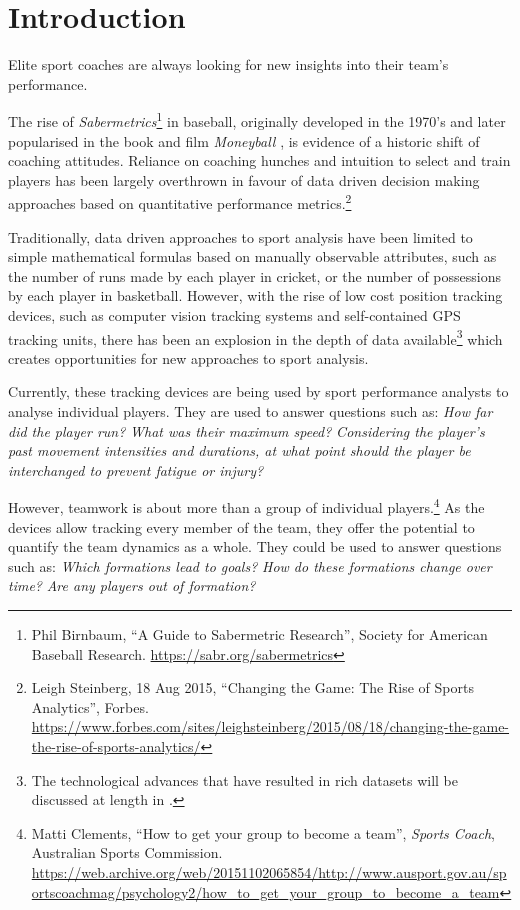 \chapter{Introduction}
\label{ch:intro}
\startchapter


Elite sport coaches are always looking for new insights into their team's performance.

The rise of \textit{Sabermetrics}\footnote{Phil Birnbaum, ``A Guide to Sabermetric Research'', Society for American Baseball Research. \url{https://sabr.org/sabermetrics}} in baseball, originally developed in the 1970's and later popularised in the book and film \textit{Moneyball} \cite{Lewis2004}, is evidence of a historic shift of coaching attitudes. Reliance on coaching hunches and intuition to select and train players has been largely overthrown in favour of data driven decision making approaches based on quantitative performance metrics.\footnote{Leigh Steinberg, 18 Aug 2015, ``Changing the Game: The Rise of Sports Analytics'', Forbes. \url{https://www.forbes.com/sites/leighsteinberg/2015/08/18/changing-the-game-the-rise-of-sports-analytics/}}

Traditionally, data driven approaches to sport analysis have been limited to simple mathematical formulas based on manually observable attributes, such as the number of runs made by each player in cricket, or the number of possessions by each player in basketball. However, with the rise of low cost position tracking devices, such as computer vision tracking systems and self-contained GPS tracking units, there has been an explosion in the depth of data available\footnote{The technological advances that have resulted in rich datasets will be discussed at length in .} which creates opportunities for new approaches to sport analysis.

Currently, these tracking devices are being used by sport performance analysts to analyse individual players. They are used to answer questions such as: \textit{How far did the player run?} \textit{What was their maximum speed?} \textit{Considering the player's past movement intensities and durations, at what point should the player be interchanged to prevent fatigue or injury?}

However, teamwork is about more than a group of individual players.\footnote{Matti Clements, ``How to get your group to become a team'', \textit{Sports Coach}, Australian Sports Commission. %
\url{https://web.archive.org/web/20151102065854/http://www.ausport.gov.au/sportscoachmag/psychology2/how_to_get_your_group_to_become_a_team}} As the devices allow tracking every member of the team, they offer the potential to quantify the team dynamics as a whole. They could be used to answer questions such as: \textit{Which formations lead to goals?} \textit{How do these formations change over time?} \textit{Are any players out of formation?} \cite{LeHoang2017}

